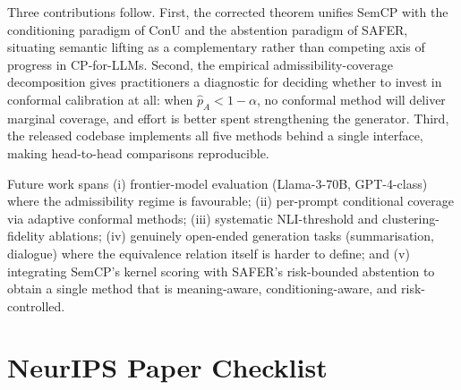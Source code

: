 \documentclass{article}
\begin{document}
Three contributions follow. First, the corrected theorem unifies SemCP with the conditioning paradigm of ConU and the abstention paradigm of SAFER, situating semantic lifting as a complementary rather than competing axis of progress in CP-for-LLMs. Second, the empirical admissibility-coverage decomposition gives practitioners a diagnostic for deciding whether to invest in conformal calibration at all: when $\hat{p}_A < 1 - \alpha$, no conformal method will deliver marginal coverage, and effort is better spent strengthening the generator. Third, the released codebase implements all five methods behind a single interface, making head-to-head comparisons reproducible.

Future work spans (i) frontier-model evaluation (Llama-3-70B, GPT-4-class) where the admissibility regime is favourable; (ii) per-prompt conditional coverage via adaptive conformal methods; (iii) systematic NLI-threshold and clustering-fidelity ablations; (iv) genuinely open-ended generation tasks (summarisation, dialogue) where the equivalence relation itself is harder to define; and (v) integrating SemCP's kernel scoring with SAFER's risk-bounded abstention to obtain a single method that is meaning-aware, conditioning-aware, and risk-controlled.




\appendix

\section*{NeurIPS Paper Checklist}
\end{document}
